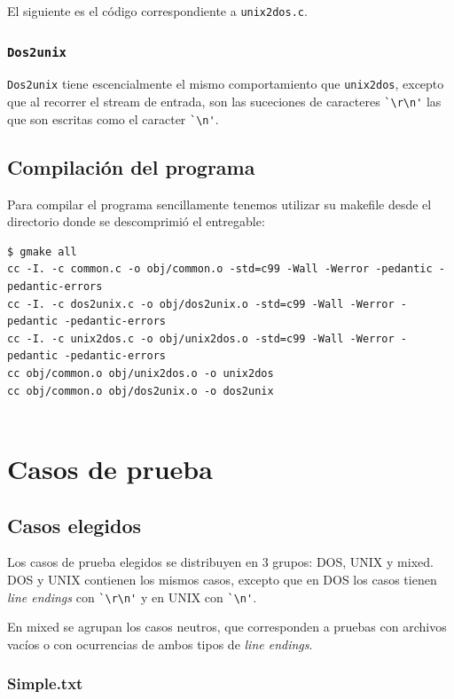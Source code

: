 \documentclass[a4paper,10pt, spanish]{article}
\begin{document}
El siguiente es el código correspondiente a \lstinline{unix2dos.c}.

\subsubsection{\lstinline{Dos2unix}}

\lstinline{Dos2unix} tiene escencialmente el mismo comportamiento que \lstinline{unix2dos},
excepto que al recorrer el stream de entrada, son las suceciones de caracteres \lstinline{`\r\n'}
las que son escritas como el caracter \lstinline{`\n'}.


\lstset{
  language=bash,
  basicstyle=\small\ttfamily
}

\subsection{Compilación del programa}
Para compilar el programa sencillamente tenemos utilizar su makefile desde el directorio donde se descomprimió el entregable:
\begin{lstlisting}
$ gmake all
cc -I. -c common.c -o obj/common.o -std=c99 -Wall -Werror -pedantic -pedantic-errors
cc -I. -c dos2unix.c -o obj/dos2unix.o -std=c99 -Wall -Werror -pedantic -pedantic-errors
cc -I. -c unix2dos.c -o obj/unix2dos.o -std=c99 -Wall -Werror -pedantic -pedantic-errors
cc obj/common.o obj/unix2dos.o -o unix2dos
cc obj/common.o obj/dos2unix.o -o dos2unix
	
\end{lstlisting}

\section{Casos de prueba}

\subsection{Casos elegidos}

Los casos de prueba elegidos se distribuyen en 3 grupos: DOS, UNIX y mixed. \\
DOS y UNIX contienen los mismos casos, excepto que en DOS los casos tienen \textit{line endings}
con \lstinline{`\r\n'} y en UNIX con \lstinline{`\n'}.

En mixed se agrupan los casos neutros, que corresponden a pruebas con archivos vacíos o con ocurrencias
de ambos tipos de \textit{line endings}.

\subsubsection{Simple.txt}
\end{document}
